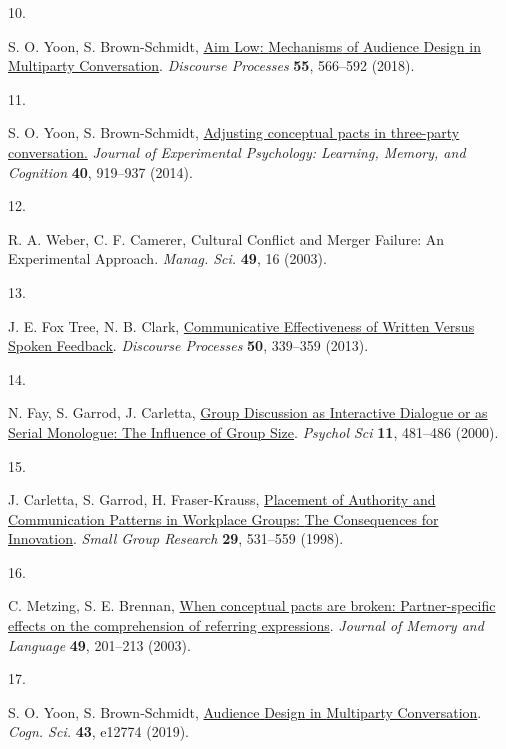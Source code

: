 \documentclass[9pt,twocolumn,twoside]{pnas-new}
\makeatletter
\newlength{\cslhangindent}
\newlength{\csllabelwidth}
\newenvironment{CSLReferences}[2] %
 {\begin{list}{}{%
  \setlength{\itemindent}{0pt}
  \setlength{\leftmargin}{0pt}
  \setlength{\parsep}{0pt}
   \normalfont\sffamily\fontsize{6}{8}\selectfont
    \labelsep2.8pt
   \renewcommand\newblock{\hskip .11em \@plus.33em \@minus.07em}
  \ifodd #1
   \setlength{\leftmargin}{\cslhangindent}
   \setlength{\itemindent}{-1\cslhangindent}
  \fi
  \setlength{\itemsep}{0.0pt}}}
 {\end{list}}
\newcommand{\CSLLeftMargin}[1]{\parbox[t]{\csllabelwidth}{#1}}
\newcommand{\CSLRightInline}[1]{\parbox[t]{\linewidth - \csllabelwidth}{#1}\break}
\makeatother
\begin{document}
\begin{CSLReferences}{0}{1}
	\CSLLeftMargin{10. }%
	\CSLRightInline{S. O. Yoon, S. Brown-Schmidt,
		\href{https://doi.org/10.1080/0163853X.2017.1286225}{Aim {Low}:
			{Mechanisms} of {Audience Design} in {Multiparty Conversation}}.
		\emph{Discourse Processes} \textbf{55}, 566--592 (2018).}
	
	\CSLLeftMargin{11. }%
	\CSLRightInline{S. O. Yoon, S. Brown-Schmidt,
		\href{https://doi.org/10.1037/a0036161}{Adjusting conceptual pacts in
			three-party conversation.} \emph{Journal of Experimental Psychology:
			Learning, Memory, and Cognition} \textbf{40}, 919--937 (2014).}
	
	\CSLLeftMargin{12. }%
	\CSLRightInline{R. A. Weber, C. F. Camerer, Cultural {Conﬂict} and
		{Merger Failure}: {An Experimental Approach}. \emph{Manag. Sci.}
		\textbf{49}, 16 (2003).}
	
	\CSLLeftMargin{13. }%
	\CSLRightInline{J. E. Fox Tree, N. B. Clark,
		\href{https://doi.org/10.1080/0163853X.2013.797241}{Communicative
			{Effectiveness} of {Written Versus Spoken Feedback}}. \emph{Discourse
			Processes} \textbf{50}, 339--359 (2013).}
	
	\CSLLeftMargin{14. }%
	\CSLRightInline{N. Fay, S. Garrod, J. Carletta,
		\href{https://doi.org/10.1111/1467-9280.00292}{Group {Discussion} as
			{Interactive Dialogue} or as {Serial Monologue}: {The Influence} of
			{Group Size}}. \emph{Psychol Sci} \textbf{11}, 481--486 (2000).}
	
	\CSLLeftMargin{15. }%
	\CSLRightInline{J. Carletta, S. Garrod, H. Fraser-Krauss,
		\href{https://doi.org/10.1177/1046496498295001}{Placement of {Authority}
			and {Communication Patterns} in {Workplace Groups}: {The Consequences}
			for {Innovation}}. \emph{Small Group Research} \textbf{29}, 531--559
		(1998).}
	
	\CSLLeftMargin{16. }%
	\CSLRightInline{C. Metzing, S. E. Brennan,
		\href{https://doi.org/10.1016/S0749-596X(03)00028-7}{When conceptual
			pacts are broken: {Partner-specific} effects on the comprehension of
			referring expressions}. \emph{Journal of Memory and Language}
		\textbf{49}, 201--213 (2003).}
	
	\CSLLeftMargin{17. }%
	\CSLRightInline{S. O. Yoon, S. Brown‐Schmidt,
		\href{https://doi.org/10.1111/cogs.12774}{Audience {Design} in
			{Multiparty Conversation}}. \emph{Cogn. Sci.} \textbf{43}, e12774
		(2019).}
	

\end{CSLReferences}
\end{document}
